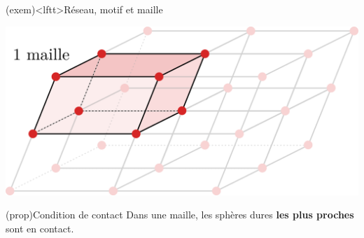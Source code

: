 \documentclass[../../main/main.tex]{subfiles}
\begin{document}
\begin{tcb}[sidebyside](exem)<lftt>{Réseau, motif et maille}
	\begin{center}
	\end{center}
	\tcblower
	\begin{center}
		\includegraphics[width=1\linewidth]{maille_paral}
	\end{center}
\end{tcb}

\begin{tcb*}(prop){Condition de contact}
	Dans une maille, les sphères dures \textbf{les plus proches} sont en contact.
	\begin{center}
	\end{center}
\end{tcb*}
\end{document}
